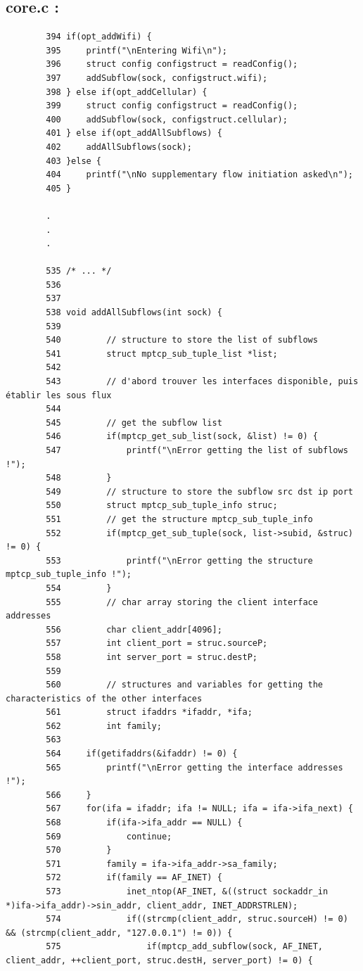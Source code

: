 \documentclass[a4paper,11pt]{article}
\begin{document}
		\subsection{core.c :}
	 	\label{subsec:core.c}
	 	\begin{lstlisting}
		394	if(opt_addWifi) {
		395		printf("\nEntering Wifi\n");
		396		struct config configstruct = readConfig();
		397		addSubflow(sock, configstruct.wifi);
	    398	} else if(opt_addCellular) {
		399		struct config configstruct = readConfig();
		400		addSubflow(sock, configstruct.cellular);
	    401	} else if(opt_addAllSubflows) {
		402		addAllSubflows(sock);
	    403	}else {
		404		printf("\nNo supplementary flow initiation asked\n");
		405	}

		.
		.
		.

		535	/* ... */
		536
		537
		538	void addAllSubflows(int sock) { 
		539	     
		540	        // structure to store the list of subflows
		541	        struct mptcp_sub_tuple_list *list;
		542	    
		543	        // d'abord trouver les interfaces disponible, puis établir les sous flux
		544	    
		545	        // get the subflow list 
		546	        if(mptcp_get_sub_list(sock, &list) != 0) {
		547	            printf("\nError getting the list of subflows !");
		548	        }
		549	        // structure to store the subflow src dst ip port
		550	        struct mptcp_sub_tuple_info struc;
		551	        // get the structure mptcp_sub_tuple_info
		552	        if(mptcp_get_sub_tuple(sock, list->subid, &struc) != 0) {
		553	            printf("\nError getting the structure mptcp_sub_tuple_info !");
		554	        }
		555	        // char array storing the client interface addresses
		556	        char client_addr[4096];
		557	        int client_port = struc.sourceP;
		558	        int server_port = struc.destP;
		559	        
		560	        // structures and variables for getting the characteristics of the other interfaces
		561	        struct ifaddrs *ifaddr, *ifa;
		562	        int family;
		563
		564		if(getifaddrs(&ifaddr) != 0) {
		565			printf("\nError getting the interface addresses !");
		566		}
		567		for(ifa = ifaddr; ifa != NULL; ifa = ifa->ifa_next) {
		568			if(ifa->ifa_addr == NULL) {
		569				continue;
		570			}
		571			family = ifa->ifa_addr->sa_family;
		572			if(family == AF_INET) {
		573				inet_ntop(AF_INET, &((struct sockaddr_in *)ifa->ifa_addr)->sin_addr, client_addr, INET_ADDRSTRLEN);
		574				if((strcmp(client_addr, struc.sourceH) != 0) && (strcmp(client_addr, "127.0.0.1") != 0)) {
		575					if(mptcp_add_subflow(sock, AF_INET, client_addr, ++client_port, struc.destH, server_port) != 0) {

\end{lstlisting}
\end{document}
